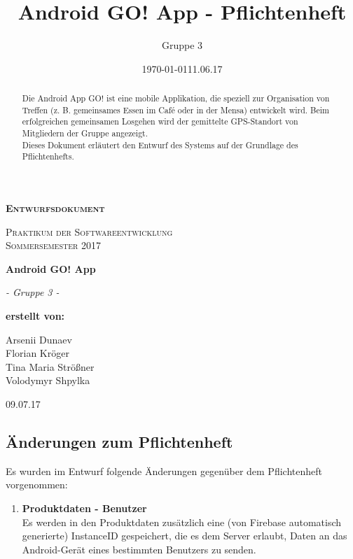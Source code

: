 \documentclass[11pt,a4paper]{report}
\date{\today}
\title{Android GO! App - Pflichtenheft}
\author{Gruppe 3}
\date{11.06.17}
\begin{document}
\begin{titlepage}
	\begin{center}
	{\scshape\LARGE \bfseries Entwurfsdokument \par}
	\vspace{1cm}
	{\scshape\Large Praktikum der Softwareentwicklung \\ Sommersemester 2017\par}
	\vspace{1.5cm}
	{\huge\bfseries Android GO! App\par}
	\vspace{2cm}
	{\Large\itshape - Gruppe 3 -\par}
	\vfill
	{\bfseries erstellt von:\par}
	Arsenii Dunaev \\
	Florian Kröger \\
	Tina Maria Strößner \\
	Volodymyr Shpylka \\	
	\vfill
	{\large 09.07.17 \par}	
	\end{center}
\end{titlepage}

\begin{abstract}
Die Android App GO! ist eine mobile Applikation, die speziell zur Organisation von Treffen (z. B. gemeinsames Essen im Café oder in der Mensa) entwickelt wird. Beim erfolgreichen gemeinsamen Losgehen wird der gemittelte GPS-Standort von Mitgliedern der Gruppe angezeigt.\\

Dieses Dokument erläutert den Entwurf des Systems auf der Grundlage des Pflichtenhefts.
\end{abstract}


\sloppy
{}
\tableofcontents




\subsection{Änderungen zum Pflichtenheft}

Es wurden im Entwurf folgende Änderungen gegenüber dem Pflichtenheft vorgenommen:
\begin{enumerate}
	\item \textbf{Produktdaten - Benutzer} \\
	Es werden in den Produktdaten zusätzlich eine (von Firebase automatisch generierte) InstanceID gespeichert, die es dem Server erlaubt, Daten an das Android-Gerät eines bestimmten Benutzers zu senden.
\end{enumerate}
\end{document}
